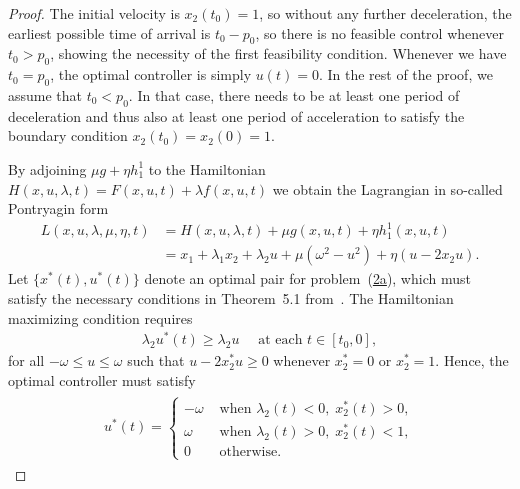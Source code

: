 \documentclass[a4paper]{article}
\theoremstyle{definition}
\theoremstyle{plain}
\begin{document}
\begin{proof}
The initial velocity is $x_{2}(t_{0}) = 1$, so without any further deceleration,
the earliest possible time of arrival is $t_{0} - p_{0}$, so there is no
feasible control whenever $t_{0} > p_{0}$, showing the necessity of the first
feasibility condition. Whenever we have $t_{0} = p_{0}$, the optimal
controller is simply $u(t) = 0$. In the rest of the proof, we assume that
$t_{0} < p_{0}$. In that case, there needs to be at least one period of
deceleration and thus also at least one period of acceleration to satisfy
the boundary condition $x_{2}(t_{0})=x_{2}(0)=1$.

By adjoining $\mu g + \eta h_{1}^{1}$ to the Hamiltonian
$H(x, u, \lambda, t) = F(x,u,t) + \lambda f(x,u,t)$ we obtain the Lagrangian in so-called
Pontryagin form
\begin{align*}
  L(x, u, \lambda, \mu, \eta, t) &= H(x, u, \lambda, t) + \mu g(x, u, t) + \eta h_{1}^{1}(x, u, t) \\
  &= x_{1}  + \lambda_{1}x_{2} + \lambda_{2}u + \mu(\omega^{2} - u^{2}) + \eta(u - 2x_{2}u) .
\end{align*}
%
Let $\{ x^{*}(t), u^{*}(t) \}$ denote an optimal pair for problem~(\hyperref[eq:setting]{2a}),
which must satisfy the necessary conditions in Theorem~5.1 from~\cite{hartlSurveyMaximumPrinciples1995}.
%
The Hamiltonian maximizing condition requires
\begin{align*}
  \lambda_{2}u^{*}(t) \geq \lambda_{2} u \quad \text{ at each } t \in [t_{0}, 0] ,
\end{align*}
for all $-\omega \leq u \leq \omega$ such that $u - 2x^{*}_{2}u \geq 0$
whenever $x_{2}^{*} = 0$ or $x_{2}^{*} = 1$. Hence, the optimal controller must
satisfy
\begin{align}
  \label{eq:optimal_u}
  \begin{split}
  u^{*}(t) =
  \begin{cases}
  -\omega &\text{ when } \lambda_{2}(t) < 0, \; x^{*}_{2}(t) > 0 , \\
  \omega &\text{ when } \lambda_{2}(t) > 0, \; x^{*}_{2}(t) < 1 , \\
  0 &\text{ otherwise. }
  \end{cases}
  \end{split}
\end{align}


\end{proof}
\end{document}
